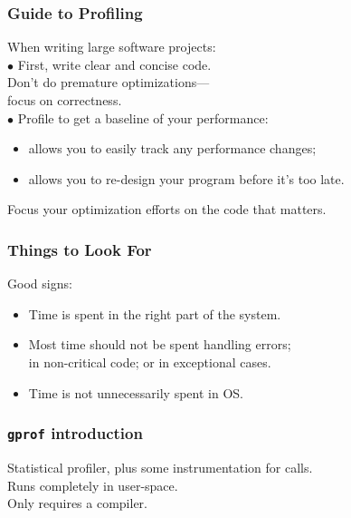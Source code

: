 \begin{frame}
  \frametitle{Guide to Profiling}

  
\large
\begin{changemargin}{1cm}
  When writing large software projects:\\[1em]

     $\bullet$ First, write clear and concise code. \\
      \qquad Don't do premature optimizations---\\
      \qquad focus on correctness.\\
     $\bullet$ Profile to get a baseline of your performance:\\[0em]
      \begin{itemize}
        \item allows you to easily track any performance changes;
        \item allows you to re-design your program before it's too late.
      \end{itemize}
  Focus your optimization efforts on the code that matters.
  \end{changemargin}
\end{frame}

\begin{frame}
  \frametitle{Things to Look For}

\large
\begin{changemargin}{1.5cm}
  
    Good signs:\\[0em]

    \begin{itemize}
      \item Time is spent in the right part of the system.
      \item Most time should not be spent handling errors;\\
 in non-critical code; or in exceptional cases.
      \item Time is not unnecessarily spent in OS.
    \end{itemize}
    \end{changemargin}
\end{frame}

\begin{frame}
  \frametitle{{\tt gprof} introduction}

  
\large
\begin{changemargin}{1.5cm}
\vspace*{-3em}
    Statistical profiler, plus some instrumentation for calls.\\[1em]
    Runs completely in user-space.\\[1em]
    Only requires a compiler.
    \end{changemargin}
\end{frame}

